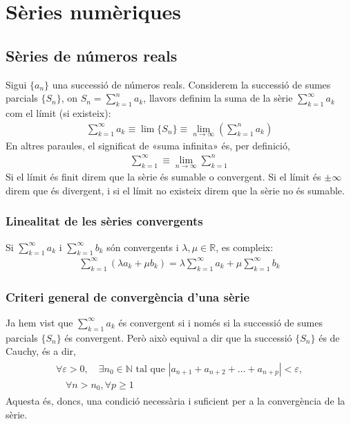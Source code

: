 \section{Sèries numèriques}
\subsection{Sèries de números reals}
Sigui $\{a_{n}\}$ una successió de números reals. Considerem la successió de sumes parcials $\{S_{n}\}$, on $S_{n} = \sum_{k=1}^{n} a_{k}$, llavors definim la suma de la sèrie $\sum_{k=1}^{\infty} a_{k}$ com el límit (si existeix):
\begin{align}
    \sum\limits_{k=1}^{\infty} a_{k} \equiv \lim \{S_{n}\} \equiv \lim_{n \to \infty} \left( \sum\limits_{k=1}^{n} a_{k} \right)
\end{align}
En altres paraules, el significat de «suma infinita» és, per definició,
\begin{align}
    \sum\limits_{k=1}^{\infty} \equiv \lim_{n \to \infty} \sum\limits_{k=1}^{n} 
\end{align}
Si el límit és finit direm que la sèrie és sumable o convergent. Si el límit és $\pm \infty$ direm que és divergent, i si el límit no existeix direm que la sèrie no és sumable.

\subsubsection*{Linealitat de les sèries convergents}
Si $\sum_{k=1}^{\infty} a_{k}$ i $\sum_{k=1}^{\infty} b_{k}$ són convergents i $\lambda, \mu \in \mathbb{R}$, es compleix:
\begin{align}
    \sum\limits_{k=1}^{\infty} (\lambda a_{k} + \mu b_{k}) = \lambda \sum\limits_{k=1}^{\infty} a_{k} + \mu \sum\limits_{k=1}^{\infty} b_{k}
\end{align}

\subsubsection*{Criteri general de convergència d'una sèrie}
Ja hem vist que $\sum_{k=1}^{\infty} a_{k}$ és convergent si i només si la successió de sumes parcials $\{S_{n}\}$ és convergent. Però això equival a dir que la successió $\{S_{n}\}$ és de Cauchy, és a dir,
\begin{align}
\begin{gathered}
    \forall \varepsilon > 0 , \quad \exists n_{0} \in \mathbb{N} \text{ tal que } | a_{n+1} + a_{n+2} + \dots + a_{n+p} | < \varepsilon , \\
    \quad \forall n > n_{0}, \forall p \geq 1
\end{gathered}
\end{align}
Aquesta és, doncs, una condició necessària i suficient per a la convergència de la sèrie.

